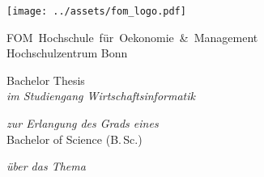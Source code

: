 %

\begin{titlepage}
    \noindent\begin{minipage}[c][.18\textwidth][t]{.18\textwidth}
        \flushleft
        \texttt{[image: ../assets/fom\_logo.pdf]}
    \end{minipage}%
    \hfill
    \begin{minipage}[c][.18\textwidth][b]{.9\textwidth}
        \rmfamily
        {\large {FOM}~Hochschule~für~Oekonomie~\&~Management} \\
        {\large Hochschulzentrum Bonn}
        \vspace{0.25cm}
    \end{minipage}

    \begin{flushleft}
        
        \vspace{5.0cm}

        {
            \rmfamily\Large
            Bachelor Thesis\\
            \rmfamily\normalsize
            \textit{im Studiengang Wirtschaftsinformatik}\\
        }

        \vspace{1.0cm}
        
        {
            \rmfamily\normalsize
            \textit{zur Erlangung des Grads eines}\\ 
            \rmfamily\Large
            Bachelor of Science (B.\,Sc.)
        }

        \vspace{1.0cm}

        {
            \rmfamily\normalsize
            \textit{über das Thema}
        }

        \vspace{0.1cm}

        {
            \rmfamily\LARGE
            \texplatetitle
        }


\end{flushleft}
\end{titlepage}
